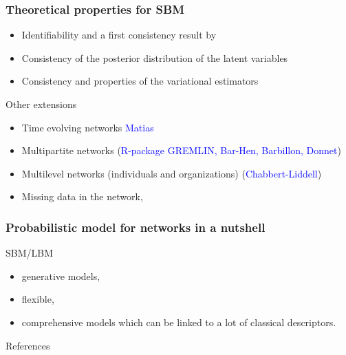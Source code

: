 \documentclass[compress,10pt]{beamer}
\begin{document}
\begin{frame}\frametitle{Theoretical properties for SBM}
\begin{itemize}
\item Identifiability and a first consistency result by \color{blue} \cite{celisse2012consistency} \color{black}
\item Consistency of the posterior distribution of the latent variables \color{blue} \cite{mariadassou2015convergence} \color{black}
\item Consistency and properties of the variational estimators \color{blue} \cite{bickel2013asymptotic} \color{black}
\end{itemize}
\end{frame}
\begin{frame}{Other extensions}

\begin{itemize}
\item  Time evolving networks \textcolor{blue}{Matias} 
\item  Multipartite networks (\textcolor{blue}{R-package GREMLIN, Bar-Hen, Barbillon, Donnet}) 
\item Multilevel networks (individuals and organizations)  (\textcolor{blue}{Chabbert-Liddell})
 \item Missing data in the network,
\end{itemize}
\end{frame}

\begin{frame}
 \frametitle{Probabilistic model for networks in a nutshell}
 
 SBM/LBM
 \begin{itemize}
  \item generative models,
  \item flexible,
  \item comprehensive models which can be linked to a lot of classical descriptors.
  
 \end{itemize}
\end{frame}


\begin{frame}[allowframebreaks]{References}

 \small{}
  \end{frame}
  
  
  
\end{document}
